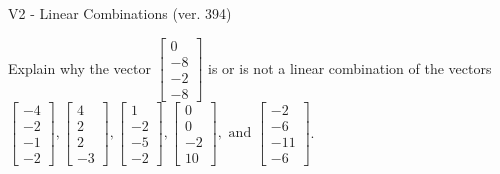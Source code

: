 \begin{exercise}
  \begin{exerciseTitle}V2 - Linear Combinations (ver. 394)\end{exerciseTitle}
  \begin{exerciseStatement}
    Explain why the vector \(\left[\begin{array}{c}
0 \\
-8 \\
-2 \\
-8
\end{array}\right]\)  is or is not a linear 
	combination of the vectors \(\left[\begin{array}{c}
-4 \\
-2 \\
-1 \\
-2
\end{array}\right] , \left[\begin{array}{c}
4 \\
2 \\
2 \\
-3
\end{array}\right] , \left[\begin{array}{c}
1 \\
-2 \\
-5 \\
-2
\end{array}\right] , \left[\begin{array}{c}
0 \\
0 \\
-2 \\
10
\end{array}\right] , \text{ and } \left[\begin{array}{c}
-2 \\
-6 \\
-11 \\
-6
\end{array}\right]\).
	



\end{exerciseStatement}
\end{exercise}
